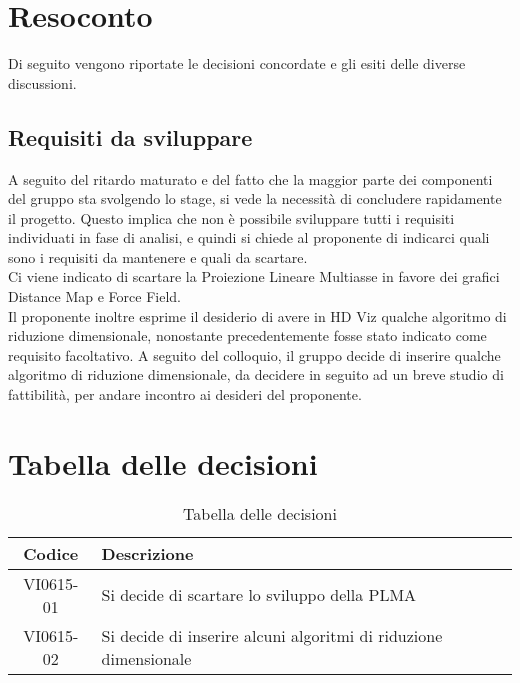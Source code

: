 \documentclass{article}
\begin{document}
\newpage
\section{Resoconto}
\label{sec:resoconto}

Di seguito vengono riportate le decisioni concordate e gli esiti delle diverse discussioni.

\subsection{Requisiti da sviluppare}
\label{itm:1}

A seguito del ritardo maturato e del fatto che la maggior parte dei componenti del gruppo sta svolgendo lo stage, si vede la necessità di concludere rapidamente il progetto. Questo implica che non è possibile sviluppare tutti i requisiti individuati in fase di analisi, e quindi si chiede al proponente di indicarci quali sono i requisiti da mantenere e quali da scartare. \\
Ci viene indicato di scartare la Proiezione Lineare Multiasse in favore dei grafici Distance Map e Force Field. \\
Il proponente inoltre esprime il desiderio di avere in HD Viz qualche algoritmo di riduzione dimensionale, nonostante precedentemente fosse stato indicato come requisito facoltativo. 
A seguito del colloquio, il gruppo decide di inserire qualche algoritmo di riduzione dimensionale, da decidere in seguito ad un breve studio di fattibilità, per andare incontro ai desideri del proponente. \\

\section{Tabella delle decisioni}%
\label{sub:decisioni}

\begin{table}[!ht]
	\centering
	\begin{tabular}{|c|p{13cm}|}
		\hline
		\rowcolor{lightgray}
		\textbf{Codice} & \textbf{Descrizione} \\
		\hline
			VI0615-01 & Si decide di scartare lo sviluppo della PLMA \\
            		VI0615-02 & Si decide di inserire alcuni algoritmi di riduzione dimensionale \\
		\hline
	\end{tabular}
	\caption{Tabella delle decisioni}
\end{table}
\end{document}

